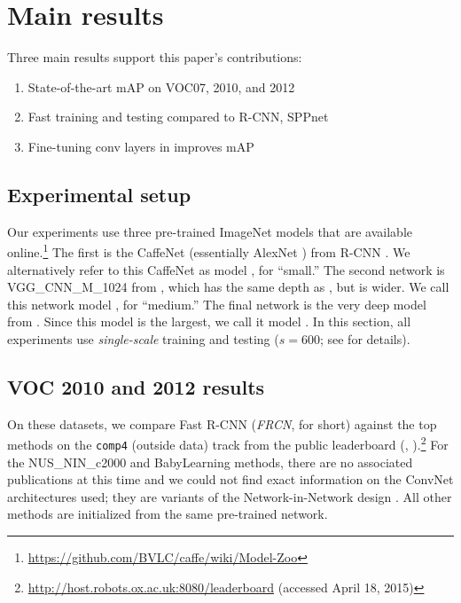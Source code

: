 \section{Main results}





Three main results support this paper's contributions:
\begin{enumerate}
  \itemsep0em
  \item State-of-the-art mAP on VOC07, 2010, and 2012
  \item Fast training and testing compared to R-CNN, SPPnet
  \item Fine-tuning conv layers in \vggsixteen improves mAP
\end{enumerate}

\subsection{Experimental setup}
Our experiments use three pre-trained ImageNet models that are available online.\footnote{\url{https://github.com/BVLC/caffe/wiki/Model-Zoo}}
The first is the CaffeNet (essentially AlexNet \cite{krizhevsky2012imagenet}) from R-CNN \cite{girshick2014rcnn}.
We alternatively refer to this CaffeNet as model \Sm, for ``small.''
The second network is VGG\_CNN\_M\_1024 from \cite{Chatfield14}, which has the same depth as \Sm, but is wider.
We call this network model \Med, for ``medium.''
The final network is the very deep \vggsixteen model from \cite{simonyan2015verydeep}.
Since this model is the largest, we call it model \Lg.
In this section, all experiments use \emph{single-scale} training and testing ($s = 600$; see  for details).

\subsection{VOC 2010 and 2012 results}
On these datasets, we compare Fast R-CNN (\emph{FRCN}, for short) against the top methods on the \texttt{comp4} (outside data) track from the public leaderboard (, ).\footnote{\url{http://host.robots.ox.ac.uk:8080/leaderboard} (accessed April 18, 2015)}
For the NUS\_NIN\_c2000 and BabyLearning methods, there are no associated publications at this time and we could not find exact information on the ConvNet architectures used; they are variants of the Network-in-Network design \cite{Lin2014NiN}.
All other methods are initialized from the same pre-trained \vggsixteen network.

